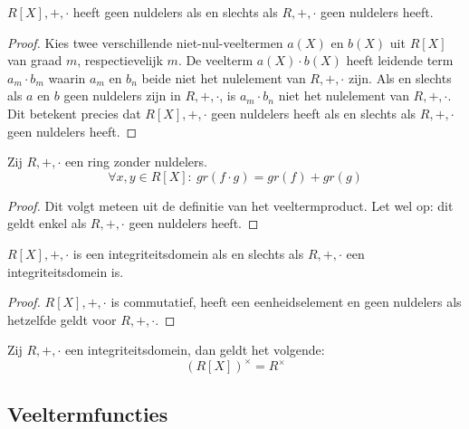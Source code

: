 \documentclass[main.tex]{subfiles}
\begin{document}
\begin{st}
  $R[X],+,\cdot$ heeft geen nuldelers als en slechts als $R,+,\cdot$ geen nuldelers heeft.

  \begin{proof}
    Kies twee verschillende niet-nul-veeltermen $a(X)$ en $b(X)$ uit $R[X]$ van graad $m$, respectievelijk $m$.
    De veelterm $a(X)\cdot b(X)$ heeft leidende term $a_{m}\cdot b_{m}$ waarin $a_{m}$ en $b_{n}$ beide niet het nulelement van $R,+,\cdot$ zijn.
    Als en slechts als $a$ en $b$ geen nuldelers zijn in $R,+,\cdot$, is $a_{m}\cdot b_{n}$ niet het nulelement van $R,+,\cdot$.
    Dit betekent precies dat $R[X],+,\cdot$ geen nuldelers heeft als en slechts als $R,+,\cdot$ geen nuldelers heeft.
  \end{proof}
\end{st}

\begin{st}
  \label{st:veeltermen-geen-nuldelers-asa-ring-geen-nuldelers}
  Zij $R,+,\cdot$ een ring zonder nuldelers.
  \[ \forall x,y \in R[X]:\ gr(f\cdot g) = gr(f) + gr(g) \]

  \begin{proof}
    Dit volgt meteen uit de definitie van het veeltermproduct.
    Let wel op: dit geldt enkel als $R,+,\cdot$ geen nuldelers heeft.
  \end{proof}
\end{st}

\begin{gev}
  \label{gev:veeltermen-domein-asa-ring-domein}
  $R[X],+,\cdot$ is een integriteitsdomein als en slechts als $R,+,\cdot$ een integriteitsdomein is.

  \begin{proof}
    $R[X],+,\cdot$ is commutatief, heeft een eenheidselement en geen nuldelers als hetzelfde geldt voor $R,+,\cdot$.
  \end{proof}
\end{gev}

\begin{st}
  Zij $R,+,\cdot$ een integriteitsdomein, dan geldt het volgende:
  \[ (R[X])^{\times} = R^{\times} \]
\end{st}

\subsection{Veeltermfuncties}
\label{sec:veeltermfuncties}
\end{document}
